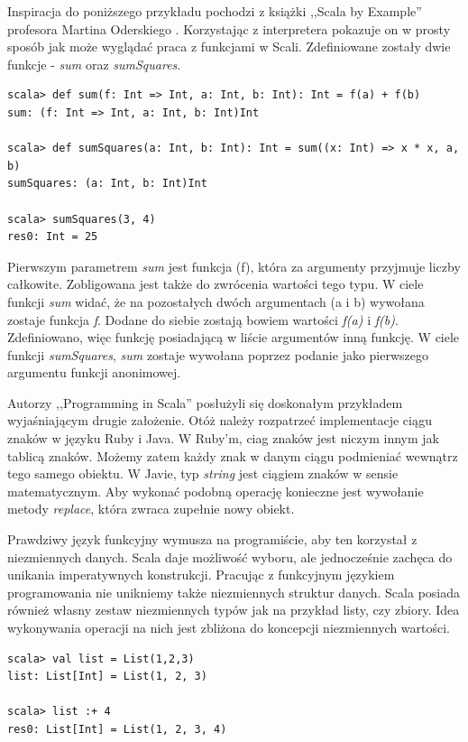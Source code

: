 \documentclass[brudnopis]{xmgr}
\begin{document}
Inspiracja do poniższego przykładu pochodzi z książki ,,Scala by Example'' profesora Martina Oderskiego \cite[s. 22]{Odersky:2014:SBE}. Korzystając z interpretera pokazuje on w prosty sposób jak może wyglądać praca z funkcjami w Scali. Zdefiniowane zostały dwie funkcje - \emph{sum} oraz \emph{sumSquares}.

\begin{verbatim}
scala> def sum(f: Int => Int, a: Int, b: Int): Int = f(a) + f(b)
sum: (f: Int => Int, a: Int, b: Int)Int

scala> def sumSquares(a: Int, b: Int): Int = sum((x: Int) => x * x, a, b)
sumSquares: (a: Int, b: Int)Int

scala> sumSquares(3, 4)
res0: Int = 25
\end{verbatim}

Pierwszym parametrem \emph{sum} jest funkcja (f), która za argumenty przyjmuje liczby całkowite. Zobligowana jest także do zwrócenia wartości tego typu. W ciele funkcji \emph{sum} widać, że na pozostałych dwóch argumentach (a i b) wywołana zostaje funkcja \emph{f}. Dodane do siebie zostają bowiem wartości \emph{f(a)} i \emph{f(b)}. Zdefiniowano, więc funkcję posiadającą w liście argumentów inną funkcję. W ciele funkcji \emph{sumSquares}, \emph{sum} zostaje wywołana poprzez podanie jako pierwszego argumentu funkcji anonimowej.

Autorzy ,,Programming in Scala'' posłużyli się doskonałym przykładem wyjaśniającym drugie założenie. \cite[s.57]{Odersky:2010:PIS} Otóż należy rozpatrzeć implementacje ciągu znaków w języku Ruby i Java. W Ruby'm, ciag znaków jest niczym innym jak tablicą znaków. Możemy zatem każdy znak w danym ciągu podmieniać wewnątrz tego samego obiektu. W Javie, typ \emph{string} jest ciągiem znaków w sensie matematycznym. Aby wykonać podobną operację konieczne jest wywołanie metody \emph{replace}, która zwraca zupełnie nowy obiekt.

Prawdziwy język funkcyjny wymusza na programiście, aby ten korzystał z niezmiennych danych. Scala daje możliwość wyboru, ale jednocześnie zachęca do unikania imperatywnych konstrukcji. Pracując z funkcyjnym językiem programowania nie unikniemy także niezmiennych struktur danych. Scala posiada również własny zestaw niezmiennych typów jak na przykład listy, czy zbiory. Idea wykonywania operacji na nich jest zbliżona do koncepcji niezmiennych wartości.

\begin{verbatim}
scala> val list = List(1,2,3)
list: List[Int] = List(1, 2, 3)

scala> list :+ 4
res0: List[Int] = List(1, 2, 3, 4)
\end{verbatim}
\end{document}
